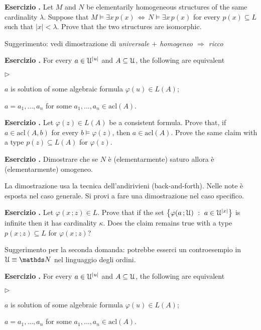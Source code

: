 \documentclass[10pt]{article}
\def\phi{\varphi}
\def\U{\EuScript U}
\def\NN{\mathds N}
\def\E{\exists}
\def\IMP{\Rightarrow}
\def\IFF{\Leftrightarrow}
\def\acl{\textrm{acl}}
\newcommand{\labella}[1]{{\sf\footnotesize #1}\hfill}
\renewenvironment{itemize}
  {\begin{list}{$\triangleright$}{%
   \setlength{\parskip}{0mm}
   \setlength{\topsep}{0mm}
   \setlength{\rightmargin}{0mm}
   \setlength{\listparindent}{0mm}
   \setlength{\itemindent}{0mm}
   \setlength{\labelwidth}{3ex}
   \setlength{\itemsep}{0mm}
   \setlength{\parsep}{0mm}
   \setlength{\partopsep}{0mm}
   \setlength{\labelsep}{1ex}
   \setlength{\leftmargin}{\labelwidth+\labelsep}
   \let\makelabel\labella}}{%
   \end{list}}
\newcounter{ex}
\newenvironment{exercise}{\clearpage\addtocounter{ex}{1}\textbf{Esercizio \theex.\quad}}{}
\begin{document}
\clearpage%
\setcounter{ex}{0}

\begin{exercise}
Let $M$ and $N$ be elementarily homogeneous structures of the same cardinality $\lambda$. Suppose that $M\models\E x\, p(x)\,\IFF\,N\models\E x\, p(x)$ for every $p(x)\subseteq L$ such that $|x|<\lambda$. Prove that the two structures are isomorphic.

Suggerimento: vedi dimostrazione di \textit{universale $+$ homogeneo $\IMP$ ricco}
\end{exercise}


\begin{exercise}
For every $a\in\U^{|u|}$ and $A\subseteq\U$, the following are equivalent
\begin{itemize}
\item[1.] $a$ is solution of some algebraic formula  $\phi(u)\in L(A)$;
\item[2.] $a= a_1,\dots, a_n$ for some $ a_1,\dots, a_n\in\acl(A)$. 
\end{itemize}
\end{exercise}

\begin{exercise}\label{pofu}
Let $\phi( z)\in L(A)$ be a consistent formula. Prove that, if $a\in\acl(A, b)$ for every $b\models\phi(z)$, then $a\in\acl(A)$. Prove the same claim with a type $p(z)\subseteq L(A)$ for $\phi(z)$.
\end{exercise}


\clearpage%
\setcounter{ex}{0}

\begin{exercise}
Dimostrare che se $N$ è (elementarmente) saturo allora è (elementarmente) omogeneo.

La dimostrazione usa la tecnica dell'andirivieni (back-and-forth). Nelle note è esposta nel caso generale. Si provi a fare una dimostrazione nel caso specifico.
\end{exercise}


\begin{exercise}
Let $\phi(x\,;z)\in L$. Prove that if the set $\big\{\phi(a\,;\U)\ :\ a\in\U^{|x|}\big\}$ is infinite then it has cardinality $\kappa$. Does the claim remains true with a type $p(x\,;z)\subseteq L$ for $\phi(x\,;z)$?

Suggerimento per la seconda domanda: potrebbe esserci un controesempio in $\U\equiv\NN$ nel linguaggio degli ordini.
\end{exercise}


\begin{exercise}
For every $a\in\U^{|u|}$ and $A\subseteq\U$, the following are equivalent
\begin{itemize}
\item[1.] $a$ is solution of some algebraic formula  $\phi(u)\in L(A)$;
\item[2.] $a= a_1,\dots, a_n$ for some $ a_1,\dots, a_n\in\acl(A)$. 
\end{itemize}
\end{exercise}
\end{document}
